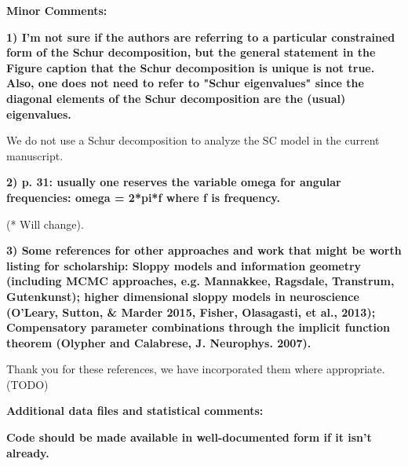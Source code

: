 \documentclass[11pt,a4paper]{article}
\begin{document}
\textbf{Minor Comments: }

\textbf{1) I'm not sure if the authors are referring to a particular constrained form of the Schur decomposition, but the general statement in the Figure caption that the Schur decomposition is unique is not true. Also, one does not need to refer to "Schur eigenvalues" since the diagonal elements of the Schur decomposition are the (usual) eigenvalues. }

We do not use a Schur decomposition to analyze the SC model in the current manuscript.

\textbf{2) p. 31: usually one reserves the variable omega for angular frequencies: omega = 2*pi*f where f is frequency. }

(* Will change).

\textbf{3) Some references for other approaches and work that might be worth listing for scholarship: Sloppy models and information geometry (including MCMC approaches, e.g. Mannakkee, Ragsdale, Transtrum, Gutenkunst); higher dimensional sloppy models in neuroscience (O'Leary, Sutton, \& Marder 2015, Fisher, Olasagasti, et al., 2013); Compensatory parameter combinations through the implicit function theorem (Olypher and Calabrese, J. Neurophys. 2007). }

Thank you for these references, we have incorporated them where appropriate. (TODO)

\textbf{Additional data files and statistical comments:}

\textbf{Code should be made available in well-documented form if it isn't already. }
\end{document}
